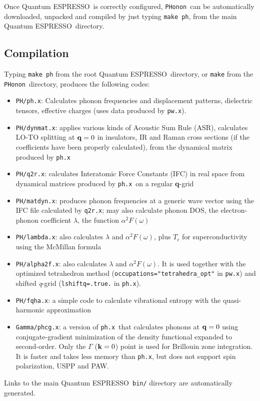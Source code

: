 \documentclass[12pt,a4paper]{article}
\def\qe{{\sc Quantum ESPRESSO}}
\def\pwx{\texttt{pw.x}}
\def\phx{\texttt{ph.x}}
\def\PHonon{\texttt{PHonon}}
\begin{document}
Once \qe\ is correctly configured, \PHonon\ can be automatically
downloaded, unpacked and compiled by
just typing \texttt{make ph}, from the main \qe\ directory.

\subsection{Compilation}

Typing \texttt{make ph} from the root \qe\ directory, or \texttt{make} 
from the \PHonon\ directory, produces the following codes:
\begin{itemize}
  \item \texttt{PH/ph.x}: Calculates phonon frequencies and displacement patterns,
    dielectric tensors, effective charges (uses data produced by \pwx). 
  \item \texttt{PH/dynmat.x}: applies various kinds of Acoustic Sum Rule (ASR),
    calculates LO-TO splitting at ${\bf q} = 0$ in insulators, IR and Raman
    cross sections (if the coefficients have been properly calculated),
    from the dynamical matrix produced by \phx
  \item \texttt{PH/q2r.x}: calculates Interatomic Force Constants (IFC) in real space
    from dynamical matrices produced by \phx\ on a regular {\bf q}-grid 
 \item \texttt{PH/matdyn.x}: produces phonon frequencies at a generic wave vector
    using the IFC file calculated by \texttt{q2r.x}; may also calculate phonon DOS, 
    the electron-phonon coefficient $\lambda$, the function $\alpha^2F(\omega)$
\item \texttt{PH/lambda.x}: also calculates $\lambda$ and $\alpha^2F(\omega)$,
   plus $T_c$ for  superconductivity using the McMillan formula
\item \texttt{PH/alpha2f.x}: also calculates $\lambda$ and $\alpha^2F(\omega)$.
  It is used together with the optimized tetrahedron method
  (\verb|occupations="tetrahedra_opt"| in \pwx) and shifted {\it q}-grid
  (\verb|lshiftq=.true.| in \phx).
\item \texttt{PH/fqha.x}: a simple code to calculate vibrational entropy with
   the quasi-harmonic approximation
\item \texttt{Gamma/phcg.x}: 
  a version of \phx\ that calculates phonons at ${\bf q} = 0$ using
  conjugate-gradient minimization of the density functional expanded to
  second-order. Only the $\Gamma$ (${\bf k} = 0$) point is used for
  Brillouin zone integration. It is faster and takes less memory than
  \phx, but does not support spin polarization, USPP and PAW.
\end{itemize}
Links to the main \qe\ \texttt{bin/} directory are automatically generated.
   
\end{document}
